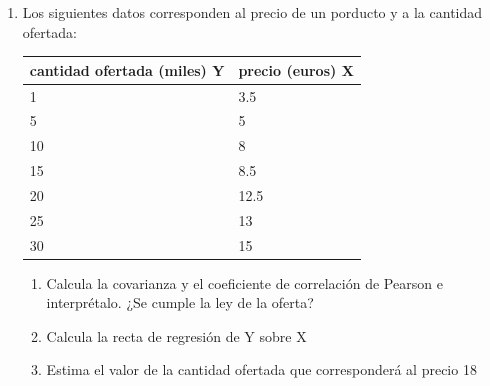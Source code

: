 \documentclass[]{book}
\providecommand{\tightlist}{%
  \setlength{\itemsep}{0pt}\setlength{\parskip}{0pt}}
\theoremstyle{plain}
\theoremstyle{definition}
\begin{document}
\begin{enumerate}
\def\labelenumi{\arabic{enumi}.}
\item
  Los siguientes datos corresponden al precio de un porducto y a la
  cantidad ofertada:

  \begin{longtable}[]{@{}ll@{}}
  \toprule
  cantidad ofertada (miles) Y & precio (euros) X\tabularnewline
  \midrule
  \endhead
  1 & 3.5\tabularnewline
  5 & 5\tabularnewline
  10 & 8\tabularnewline
  15 & 8.5\tabularnewline
  20 & 12.5\tabularnewline
  25 & 13\tabularnewline
  30 & 15\tabularnewline
  \bottomrule
  \end{longtable}

  \begin{enumerate}
  \def\labelenumii{\arabic{enumii}.}
  \tightlist
  \item
    Calcula la covarianza y el coeficiente de correlación de Pearson e
    interprétalo. ¿Se cumple la ley de la oferta?
  \item
    Calcula la recta de regresión de Y sobre X
  \item
    Estima el valor de la cantidad ofertada que corresponderá al precio
    18
  \end{enumerate}
\end{enumerate}
\end{document}
